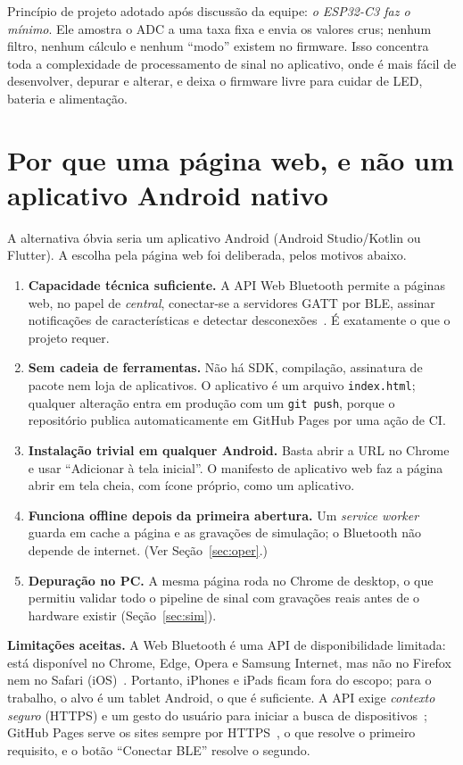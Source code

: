\documentclass[conference,a4paper]{IEEEtran}
\newcommand{\code}[1]{\texttt{#1}}
\begin{document}
Princípio de projeto adotado após discussão da equipe: \emph{o ESP32-C3 faz o mínimo}. Ele amostra o ADC a uma taxa fixa e envia os valores crus; nenhum filtro, nenhum cálculo e nenhum ``modo'' existem no firmware. Isso concentra toda a complexidade de processamento de sinal no aplicativo, onde é mais fácil de desenvolver, depurar e alterar, e deixa o firmware livre para cuidar de LED, bateria e alimentação.

\section{Por que uma página web, e não um aplicativo Android nativo}
\label{sec:web}
A alternativa óbvia seria um aplicativo Android (Android Studio/Kotlin ou Flutter). A escolha pela página web foi deliberada, pelos motivos abaixo.

\begin{enumerate}[leftmargin=*]
\item \textbf{Capacidade técnica suficiente.} A API Web Bluetooth permite a páginas web, no papel de \emph{central}, conectar-se a servidores GATT por BLE, assinar notificações de características e detectar desconexões~\cite{chrome-wb}. É exatamente o que o projeto requer.
\item \textbf{Sem cadeia de ferramentas.} Não há SDK, compilação, assinatura de pacote nem loja de aplicativos. O aplicativo é um arquivo \code{index.html}; qualquer alteração entra em produção com um \code{git push}, porque o repositório publica automaticamente em GitHub Pages por uma ação de CI.
\item \textbf{Instalação trivial em qualquer Android.} Basta abrir a URL no Chrome e usar ``Adicionar à tela inicial''. O manifesto de aplicativo web faz a página abrir em tela cheia, com ícone próprio, como um aplicativo.
\item \textbf{Funciona offline depois da primeira abertura.} Um \emph{service worker} guarda em cache a página e as gravações de simulação; o Bluetooth não depende de internet. (Ver Seção~\ref{sec:oper}.)
\item \textbf{Depuração no PC.} A mesma página roda no Chrome de desktop, o que permitiu validar todo o pipeline de sinal com gravações reais antes de o hardware existir (Seção~\ref{sec:sim}).
\end{enumerate}

\noindent\textbf{Limitações aceitas.} A Web Bluetooth é uma API de disponibilidade limitada: está disponível no Chrome, Edge, Opera e Samsung Internet, mas não no Firefox nem no Safari (iOS)~\cite{mdn-wb}. Portanto, iPhones e iPads ficam fora do escopo; para o trabalho, o alvo é um tablet Android, o que é suficiente. A API exige \emph{contexto seguro} (HTTPS) e um gesto do usuário para iniciar a busca de dispositivos~\cite{mdn-wb,chrome-wb}; GitHub Pages serve os sites sempre por HTTPS~\cite{gh-pages-https}, o que resolve o primeiro requisito, e o botão ``Conectar BLE'' resolve o segundo.
\end{document}
